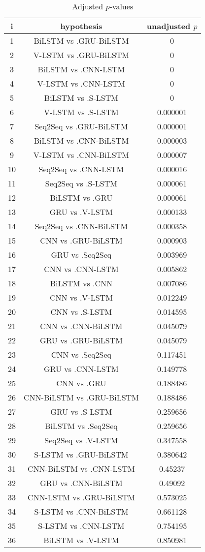 \documentclass[a4paper,10pt]{article}
\begin{document}
\begin{landscape}
\begin{table}[!htp]
\centering\scriptsize
\begin{tabular}{ccc}
i&hypothesis&unadjusted $p$\\
\hline1&BiLSTM vs .GRU-BiLSTM&0\\
2&V-LSTM vs .GRU-BiLSTM&0\\
3&BiLSTM vs .CNN-LSTM&0\\
4&V-LSTM vs .CNN-LSTM&0\\
5&BiLSTM vs .S-LSTM&0\\
6&V-LSTM vs .S-LSTM&0.000001\\
7&Seq2Seq vs .GRU-BiLSTM&0.000001\\
8&BiLSTM vs .CNN-BiLSTM&0.000003\\
9&V-LSTM vs .CNN-BiLSTM&0.000007\\
10&Seq2Seq vs .CNN-LSTM&0.000016\\
11&Seq2Seq vs .S-LSTM&0.000061\\
12&BiLSTM vs .GRU&0.000061\\
13&GRU vs .V-LSTM&0.000133\\
14&Seq2Seq vs .CNN-BiLSTM&0.000358\\
15&CNN vs .GRU-BiLSTM&0.000903\\
16&GRU vs .Seq2Seq&0.003969\\
17&CNN vs .CNN-LSTM&0.005862\\
18&BiLSTM vs .CNN&0.007086\\
19&CNN vs .V-LSTM&0.012249\\
20&CNN vs .S-LSTM&0.014595\\
21&CNN vs .CNN-BiLSTM&0.045079\\
22&GRU vs .GRU-BiLSTM&0.045079\\
23&CNN vs .Seq2Seq&0.117451\\
24&GRU vs .CNN-LSTM&0.149778\\
25&CNN vs .GRU&0.188486\\
26&CNN-BiLSTM vs .GRU-BiLSTM&0.188486\\
27&GRU vs .S-LSTM&0.259656\\
28&BiLSTM vs .Seq2Seq&0.259656\\
29&Seq2Seq vs .V-LSTM&0.347558\\
30&S-LSTM vs .GRU-BiLSTM&0.380642\\
31&CNN-BiLSTM vs .CNN-LSTM&0.45237\\
32&GRU vs .CNN-BiLSTM&0.49092\\
33&CNN-LSTM vs .GRU-BiLSTM&0.573025\\
34&S-LSTM vs .CNN-BiLSTM&0.661128\\
35&S-LSTM vs .CNN-LSTM&0.754195\\
36&BiLSTM vs .V-LSTM&0.850981\\
\hline
\end{tabular}
\caption{Adjusted $p$-values}
\end{table}

\end{landscape}
\end{document}
